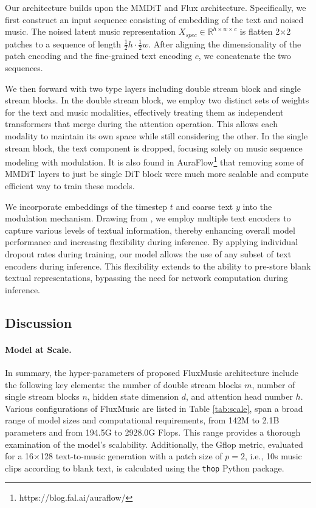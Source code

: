Our architecture builds upon the MMDiT \cite{esser2024scaling} and Flux architecture. Specifically, we first construct an input sequence consisting of embedding of the text and noised music. The noised latent music representation $X_{spec} \in \mathbb{R}^{h\times w \times c}$ is flatten 2$\times$2 patches to a sequence of length $\frac{1}{2}h \cdot \frac{1}{2}w$. After aligning the dimensionality of the patch encoding and the fine-grained text encoding $c$, we concatenate the two sequences. 

We then forward with two type layers including double stream block and single stream blocks. In the double stream block, we employ two distinct sets of weights for the text and music modalities, effectively treating them as independent transformers that merge during the attention operation. This allows each modality to maintain its own space while still considering the other. 
In the single stream block, the text component is dropped, focusing solely on music sequence modeling with modulation.  
It is also found in AuraFlow\footnote{https://blog.fal.ai/auraflow/} that removing some of MMDiT layers to just be single DiT block were much more scalable and compute efficient way to train these models. 

We incorporate embeddings of the timestep $t$ and coarse text $y$ into the modulation mechanism. 
Drawing from \cite{esser2024scaling}, we employ multiple text encoders to capture various levels of textual information, thereby enhancing overall model performance and increasing flexibility during inference. By applying individual dropout rates during training, our model allows the use of any subset of text encoders during inference. This flexibility extends to the ability to pre-store blank textual representations, bypassing the need for network computation during inference.

\subsection{Discussion}

\paragraph{Model at Scale.}
In summary, the hyper-parameters of proposed FluxMusic architecture include the following key elements:  
the number of double stream blocks $m$, number of single stream blocks $n$, hidden state dimension $d$, and attention head number $h$. 
Various configurations of FluxMusic are listed in Table \ref{tab:scale}, span a broad range of model sizes and computational requirements, from 142M to 2.1B parameters and from 194.5G to 2928.0G Flops. This range provides a thorough examination of the model's scalability.  
Additionally, the Gflop metric, evaluated for a  16$\times$128 text-to-music generation with a patch size of $p=2$, i.e., 10s music clips according to blank text, is calculated using the \texttt{thop} Python package.

